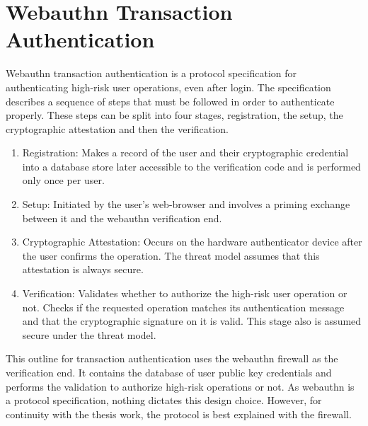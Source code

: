 \chapter{Webauthn Transaction Authentication}\label{Chap:WebauthnTransactionAuthentication}

Webauthn transaction authentication is a protocol specification for authenticating high-risk user operations, even after login. The specification describes a sequence of steps that must be followed in order to authenticate properly. These steps can be split into four stages, registration, the setup, the cryptographic attestation and then the verification. 

\begin{enumerate}[nosep]
\item Registration: Makes a record of the user and their cryptographic credential into a database store later accessible to the verification code and is performed only once per user.

\item Setup: Initiated by the user's web-browser and involves a priming exchange between it and the webauthn verification end.

\item Cryptographic Attestation: Occurs on the hardware authenticator device after the user confirms the operation. The threat model assumes that this attestation is always secure.

\item Verification: Validates whether to authorize the high-risk user operation or not. Checks if the requested operation matches its authentication message and that the cryptographic signature on it is valid. This stage also is assumed secure under the threat model.

\end{enumerate}

This outline for transaction authentication uses the webauthn firewall as the verification end. It contains the database of user public key credentials and performs the validation to authorize high-risk operations or not. As webauthn is a protocol specification, nothing dictates this design choice. However, for continuity with the thesis work, the protocol is best explained with the firewall.

